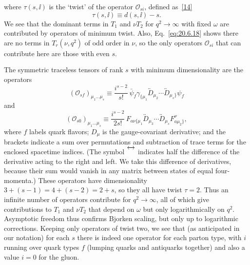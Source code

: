where $\tau(s,\ii)$ is the `twist' of the operator $\mathcal O_{si}$, defined as~\hyperref[ch20-ref-14]{[14]}
\begin{equation}
\tau(s,\ii)\equiv d(s,\ii)-s.
\tag{20.6.22}\label{eq:20.6.22}
\end{equation}
We see that the dominant terms in $T_1$ and $\nu T_2$ for $q^2\to\infty$ with fixed $\omega$ are contributed by operators of minimum twist. Also, Eq.~\eqref{eq:20.6.18} shows there are no terms in $T_r(\nu,q^2)$ of odd order in $\nu$, so the only operators $\mathcal O_{si}$ that can contribute here are those with even $s$.

The symmetric traceless tensors of rank $s$ with minimum dimensionality are the operators
\begin{equation}
(\mathcal O_{sf})_{\mu_1\ldots\mu_s}
\equiv
\frac{i^{s-2}}{s!}\,
\bar\psi_f\gamma_{\{\mu_1}
\overleftrightarrow D_{\mu_2}\cdots
\overleftrightarrow D_{\mu_s\}}\psi_f
\tag{20.6.23}\label{eq:20.6.23}
\end{equation}
and
\begin{equation}
(\mathcal O_{s0})_{\mu_1\ldots\mu_s}
\equiv
\frac{i^{s-2}}{2s!}\,
F_{a\nu\{\mu_1}
\overleftrightarrow D_{\mu_3}\cdots
\overleftrightarrow D_{\mu_s}
F^\nu_{a\mu_2\}},
\tag{20.6.24}\label{eq:20.6.24}
\end{equation}
where $f$ labels quark flavors; $D_\mu$ is the gauge-covariant derivative; and the brackets indicate a sum over permutations and subtraction of trace terms for the enclosed spacetime indices. (The symbol $\overleftrightarrow{\vphantom D}$ indicates half the difference of the derivative acting to the right and left. We take this difference of derivatives, because their sum would vanish in any matrix between states of equal four-momenta.) These operators have dimensionality $3+(s-1)=4+(s-2)=2+s$, so they all have twist $\tau=2$. Thus an infinite number of operators contribute for $q^2\to\infty$, all of which give contributions to $T_1$ and $\nu T_2$ that depend on $\omega$ but only logarithmically on $q^2$. Asymptotic freedom thus confirms Bjorken scaling, but only up to logarithmic corrections. Keeping only operators of twist two, we see that (as anticipated in our notation) for each $s$ there is indeed one operator for each parton type, with $i$ running over quark types $f$ (lumping quarks and antiquarks together) and also a value $i=0$ for the gluon.

